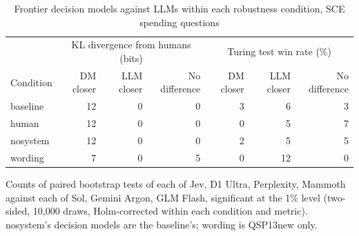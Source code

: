 \begin{table}[htbp]
\centering
\caption{Frontier decision models against LLMs within each robustness condition, SCE spending questions}
\label{tab:sce_robustness_headline}
\begin{tabular}{lrrrrrr}
\toprule
 & \multicolumn{3}{c}{KL divergence from humans (bits)} & \multicolumn{3}{c}{Turing test win rate (\%)} \\
Condition & DM closer & LLM closer & No difference & DM closer & LLM closer & No difference \\
\midrule
baseline & 12 & 0 & 0 & 3 & 6 & 3 \\
human & 12 & 0 & 0 & 0 & 5 & 7 \\
nosystem & 12 & 0 & 0 & 2 & 5 & 5 \\
wording & 7 & 0 & 5 & 0 & 12 & 0 \\
\bottomrule
\end{tabular}
\par\smallskip
\parbox{\linewidth}{\footnotesize Counts of paired bootstrap tests of each of Jev, D1 Ultra, Perplexity, Mammoth against each of Sol, Gemini Argon, GLM Flash, significant at the 1\% level (two-sided, 10,000 draws, Holm-corrected within each condition and metric). nosystem's decision models are the baseline's; wording is QSP13new only.}
\end{table}
